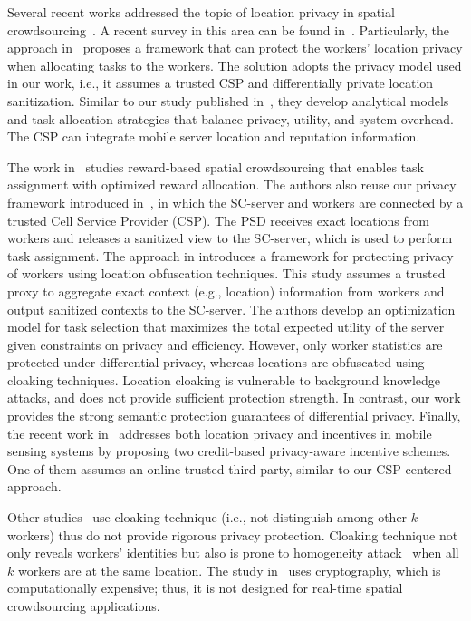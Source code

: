 \documentclass{USC-Thesis}
\numberwithin{equation}{chapter}
\begin{document}
Several recent works addressed the topic of location privacy in spatial crowdsourcing~\cite{pournajaf2014spatial,to2015privgeocrowd,Gong15b,Gong15b,zhang2015differentially,hu2015protecting,Li2016}.
A recent survey in this area can be found in~\cite{pournajaf2015participant}.
Particularly, the approach in~\cite{Gong15a} proposes a framework that can protect the workers' location privacy when allocating tasks to the workers. The solution adopts the privacy model used in our work, i.e., it assumes a trusted CSP and differentially private location sanitization. Similar to our study published in~\cite{to2014framework,to2016sc}, they develop analytical models and task allocation strategies that balance privacy, utility, and system overhead. The CSP can integrate mobile server location and reputation information.

The work in~\cite{zhang2015differentially} studies reward-based spatial crowdsourcing that enables task assignment with optimized reward allocation. The authors also reuse our privacy framework introduced in~\cite{to2014framework}, in which the SC-server and workers are connected by a trusted Cell Service Provider (CSP). The PSD receives exact locations from workers and releases a sanitized view to the SC-server, which is used to perform task assignment. 
The approach in \cite{Gong15b} introduces a framework for protecting privacy of workers using location obfuscation techniques. This study assumes a trusted proxy to aggregate exact context (e.g., location) information from workers and output sanitized contexts to the SC-server. The authors develop an optimization model for task selection that maximizes the total expected utility of the server given constraints on privacy and efficiency. However, only worker statistics are protected under differential privacy, whereas locations are obfuscated using cloaking techniques. Location cloaking is vulnerable to background knowledge attacks, and does not provide sufficient protection strength. In contrast, our work provides the strong semantic protection guarantees of differential privacy. Finally, the recent work in~\cite{Li2016} addresses both location privacy and incentives in mobile sensing systems by proposing two credit-based privacy-aware incentive schemes. One of them assumes an online trusted third party, similar to our CSP-centered approach. 

Other studies~\cite{pournajaf2014spatial,hu2015protecting} use cloaking technique (i.e., not distinguish among other $k$ workers) thus do not provide rigorous privacy protection. Cloaking technique not only reveals workers' identities but also is prone to homogeneity attack~\cite{machanavajjhala2007diversity} when all $k$ workers are at the same location.
The study in~\cite{Li2016} uses cryptography, which is computationally expensive; thus, it is not designed for real-time spatial crowdsourcing applications.
\end{document}
